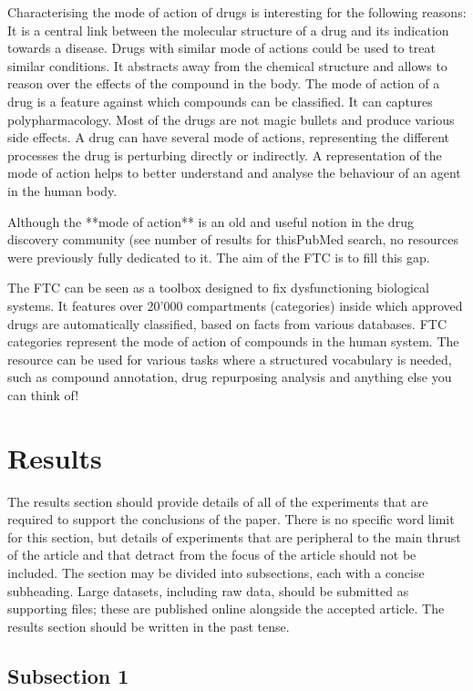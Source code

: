 \documentclass[10pt]{article}
\begin{document}
Characterising the mode of action of drugs is interesting for the following reasons:
It is a central link between the molecular structure of a drug and its indication towards a disease. Drugs with similar
mode of actions could be used to treat similar conditions.
It abstracts away from the chemical structure and allows to reason over the effects of the compound in the body. The mode of action
of a drug is a feature against which compounds can be classified.
It can captures polypharmacology. Most of the drugs are not magic bullets
and produce various side effects. A drug can have several mode of actions, representing the different processes the drug is perturbing directly
or indirectly.
A representation of the mode of action helps to better understand and analyse the behaviour of an agent in the human body.

Although the **mode of action** is an old and useful notion in the drug discovery 
community (see number of results for thisPubMed search, no resources were
previously fully dedicated to it. The aim of the FTC is to fill this gap.

The FTC can be seen as a toolbox designed to fix dysfunctioning biological systems.
It features over 20'000 compartments (categories) inside which approved 
drugs are automatically classified, based on facts from various databases.
FTC categories represent the mode of action of compounds in the human system. 
The resource can be used for various tasks where a structured vocabulary is needed, such as compound annotation, drug repurposing analysis and 
anything else you can think of!


\section*{Results}

The results section should provide details of all of the experiments that 
are required to support the conclusions of the paper. There is no specific word limit for 
this section, but details of experiments that are peripheral to the main thrust of the article and that 
detract from the focus of the article should not be included. The section may be divided into subsections, 
each with a concise subheading. Large datasets, including raw data, should be submitted as supporting files; 
these are published online alongside the accepted article. The results section should be written in the past tense.

\subsection*{Subsection 1}
\end{document}
